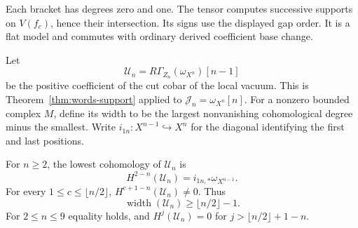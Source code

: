 Each bracket has degrees zero and one. The tensor computes
successive supports on $V(f_c)$, hence their intersection.
Its signs use the displayed gap order. It is a flat model and
commutes with ordinary derived coefficient base change.

Let
\[
 \mathcal U_n=R\Gamma_{Z_n}(\omega_{X^n})[n-1]
\]
be the positive coefficient of the cut cobar of the local vacuum.
This is Theorem~\ref{thm:words-support} applied to
$\mathcal J_n=\omega_{X^n}[n]$. For a nonzero bounded complex
$M$, define its width to be the largest nonvanishing cohomological
degree minus the smallest.
Write $i_{1n}:X^{n-1}\hookrightarrow X^n$ for the diagonal
identifying the first and last positions.

\begin{theorem}\label{cbc:ct:amplitude}
For $n\geq2$, the lowest cohomology of $\mathcal U_n$ is
\[
 H^{2-n}(\mathcal U_n)=i_{1n,*}\omega_{X^{n-1}}.
\]
For every $1\leq c\leq\lfloor n/2\rfloor$,
$H^{c+1-n}(\mathcal U_n)\ne0$. Thus
\[
 \operatorname{width}(\mathcal U_n)\geq\lfloor n/2\rfloor-1.
\]
For $2\leq n\leq9$ equality holds, and
$H^j(\mathcal U_n)=0$ for $j>\lfloor n/2\rfloor+1-n$.
\end{theorem}

